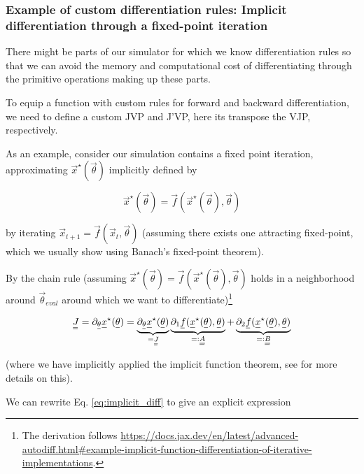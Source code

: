\subsubsection{Example of custom differentiation rules: Implicit differentiation through a
fixed-point iteration}
\label{sec:custom_diff}

There might be parts of our simulator for which we know differentiation rules so that
we can avoid the memory and computational cost of differentiating through the primitive
operations making up these parts.

To equip a function with custom rules for forward and backward differentiation, we
need to define a custom JVP and J'VP, here its transpose the VJP, respectively.

As an example, consider our simulation contains a fixed point iteration, approximating
$\vec{x}^\star(\vec{\theta})$ implicitly defined by

\begin{equation}
    \vec{x}^\star(\vec{\theta}) = \vec{f}(\vec{x}^\star(\vec{\theta}), \vec{\theta})
\end{equation}

by iterating $\vec{x}_{t+1} = \vec{f}(\vec{x}_t, \vec{\theta})$ (assuming there exists one
attracting fixed-point, which we usually show using Banach's fixed-point theorem).

By the chain rule (assuming $\vec{x}^\star(\vec{\theta}) = \vec{f}(\vec{x}^\star(\vec{\theta}), \vec{\theta})$ holds in a neighborhood around
$\vec{\theta}_{eval}$ around which we want to differentiate)\footnote{The derivation follows \url{https://docs.jax.dev/en/latest/advanced-autodiff.html\#example-implicit-function-differentiation-of-iterative-implementations}.}

\begin{equation}
    \mat{J} = \partial_\vec{\theta} \vec{x}^\star(\vec{\theta}) = \underbrace{\partial_\vec{\theta} \vec{x}^\star(\vec{\theta})}_{=\mat{J}} \underbrace{\partial_1 \vec{f}(\vec{x}^\star(\vec{\theta}), \vec{\theta})}_{=:\mat{A}} + \underbrace{\partial_2 \vec{f}(\vec{x}^\star(\vec{\theta}), \vec{\theta})}_{=:\mat{B}}
    \label{eq:implicit_diff}
\end{equation}

(where we have implicitly applied the implicit function theorem, see \cite{blondel22} for more details on this).

We can rewrite Eq. \ref{eq:implicit_diff} to give an explicit expression

